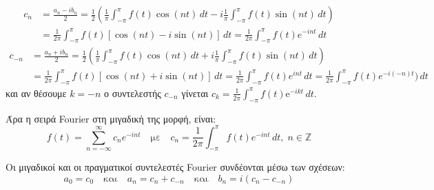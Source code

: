   \begin{align*}
    c_{n} &= \frac{a_{n}-ib_{n}}{2} = \frac{1}{2} 
    \left(\frac{1}{\pi} \int _{- \pi }^{\pi } f(t) \cos{(nt)} \,{dt} - i
    \frac{1}{\pi} \int _{- \pi }^{\pi } f(t) \sin{(nt)} \,{dt}  \right) \\ 
          &= \frac{1}{2 \pi} \int _{- \pi }^{\pi} f(t) [\cos{(nt)} - i \sin{(nt)}] 
          \,{dt} = \frac{1}{2 \pi} \int _{- \pi }^{\pi } f(t) e^{-int} \,{dt}
  \end{align*} 
  \begin{align*}
    c_{-n} &= \frac{a_{n}+ib_{n}}{2} = \frac{1}{2} 
    \left(\frac{1}{\pi} \int _{- \pi }^{\pi } f(t) \cos{(nt)} \,{dt} + i
    \frac{1}{\pi} \int _{- \pi }^{\pi } f(t) \sin{(nt)} \,{dt}  \right) \\ 
           &= \frac{1}{2 \pi} \int _{- \pi }^{\pi} f(t) [\cos{(nt)} + i \sin{(nt)}] 
           \,{dt} = \frac{1}{2 \pi} \int _{- \pi }^{\pi } f(t) e^{int} \,{dt} = 
           \frac{1}{2 \pi} \int _{- \pi }^{\pi } f(t) e^{-i(-n)t}) \,{dt} 
  \end{align*}
  και αν θέσουμε $ k=-n $ ο συντελεστής $ c_{-n} $ γίνεται $ c_{k} =
  \frac{1}{2 \pi} \int _{- \pi }^{\pi} f(t) \mathrm{e}^{-ikt}\,{dt} $.

  Άρα η σειρά Fourier στη μιγαδική της μορφή, είναι:
  \[
    \boxed{f(t) = \sum_{n=- \infty}^{\infty} c_{n} e^{-int} \quad \text{με} \quad c_{n} =
    \frac{1}{2 \pi} \int _{- \pi}^{\pi } f(t) e^{-int} \,{dt}, \; n \in \mathbb{Z}}
  \]

  \begin{rem}
    Οι μιγαδικοί και οι πραγματικοί συντελεστές Fourier συνδέονται μέσω των σχέσεων:
    \begin{equation}\label{eq:complex_coef}
      a_{0}= c_{0} \quad \text{και} \quad a_{n}= c_{n}+c_{-n} \quad \text{και} \quad 
      b_{n} = i(c_{n}-c_{-n})
    \end{equation} 
  \end{rem}


  





